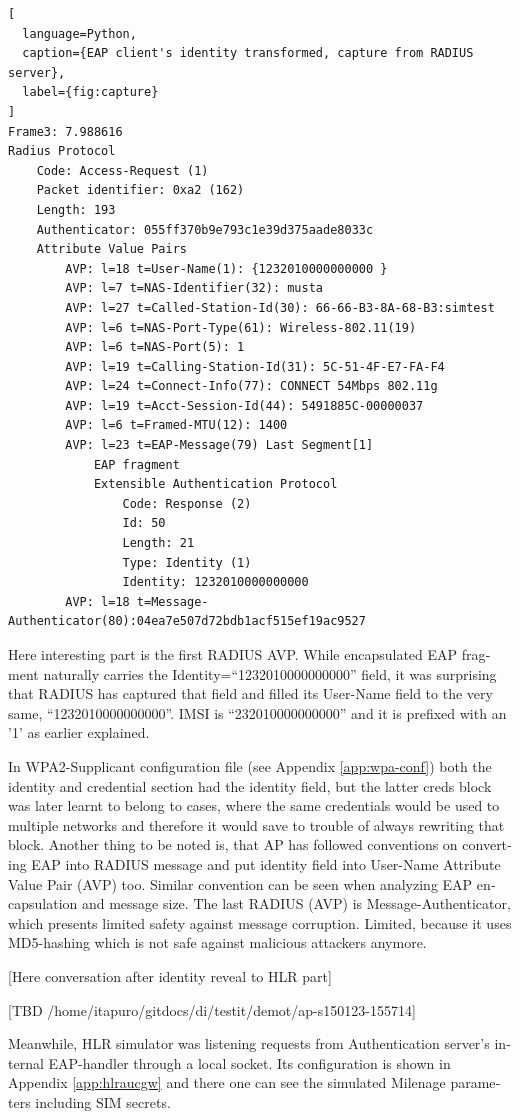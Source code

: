 \documentclass[12pt,a4paper,english]{tutthesis}
\begin{document}
\begin{otherlanguage}{english}
\begin{lstlisting}[
  language=Python,
  caption={EAP client's identity transformed, capture from RADIUS server},
  label={fig:capture}
]
Frame3: 7.988616
Radius Protocol
    Code: Access-Request (1)
    Packet identifier: 0xa2 (162)
    Length: 193
    Authenticator: 055ff370b9e793c1e39d375aade8033c
    Attribute Value Pairs
        AVP: l=18 t=User-Name(1): {1232010000000000 }
        AVP: l=7 t=NAS-Identifier(32): musta
        AVP: l=27 t=Called-Station-Id(30): 66-66-B3-8A-68-B3:simtest
        AVP: l=6 t=NAS-Port-Type(61): Wireless-802.11(19)
        AVP: l=6 t=NAS-Port(5): 1
        AVP: l=19 t=Calling-Station-Id(31): 5C-51-4F-E7-FA-F4
        AVP: l=24 t=Connect-Info(77): CONNECT 54Mbps 802.11g
        AVP: l=19 t=Acct-Session-Id(44): 5491885C-00000037
        AVP: l=6 t=Framed-MTU(12): 1400
        AVP: l=23 t=EAP-Message(79) Last Segment[1]
            EAP fragment
            Extensible Authentication Protocol
                Code: Response (2)
                Id: 50
                Length: 21
                Type: Identity (1)
                Identity: 1232010000000000
        AVP: l=18 t=Message-Authenticator(80):04ea7e507d72bdb1acf515ef19ac9527
\end{lstlisting}
\normalsize


Here interesting part is the first RADIUS AVP.
While encapsulated EAP fragment naturally carries the Identity=``1232010000000000''
field, it was surprising that RADIUS has captured that field and 
filled its User-Name field to the very same, ``1232010000000000''. 
IMSI is ``232010000000000'' and it is prefixed with
an '1' as earlier explained.

In WPA2-Supplicant configuration file (see Appendix \ref{app:wpa-conf}) both the identity and
credential section had the identity field, but the latter creds block
was later learnt to belong to cases, where the same credentials would
be used to multiple networks and therefore it would save to trouble of
always rewriting that block.
Another thing to be noted is, that AP has followed conventions on
converting EAP into RADIUS message and put identity field into
User-Name Attribute Value Pair (AVP) too.
Similar convention can be seen when analyzing EAP encapsulation and
message size. The last RADIUS (AVP) is 
Message-Authenticator, which presents limited safety against message 
corruption. Limited, because it uses MD5-hashing which is not safe
against malicious attackers anymore.

[Here conversation after identity reveal to HLR part]

[TBD /home/itapuro/gitdocs/di/testit/demot/ap-s150123-155714]

Meanwhile, HLR simulator was listening requests from Authentication
server's internal EAP-handler through a local socket. 
Its configuration is shown in
Appendix \ref{app:hlraucgw} and there one can see the simulated Milenage parameters including SIM secrets.




\end{otherlanguage}
\end{document}
